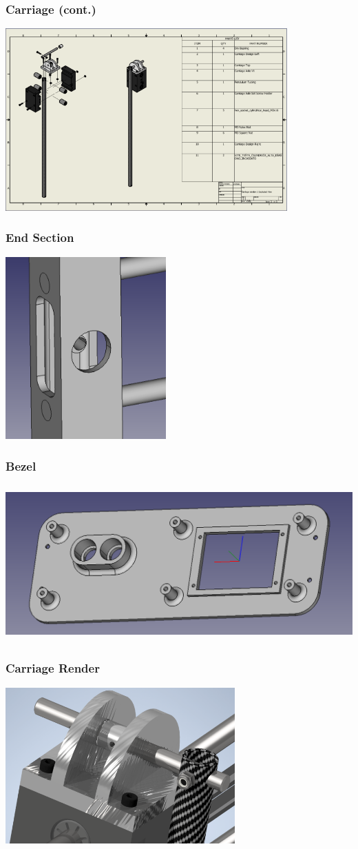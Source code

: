 \documentclass[aspectratio=169]{beamer}
\begin{document}
\begin{frame}
    \frametitle{Carriage (cont.)}

    \includegraphics[height=7cm]{closeup2}
\end{frame}

\begin{frame}
    \frametitle{End Section}

    \includegraphics[height=7cm]{closeup3}
\end{frame}

\begin{frame}
    \frametitle{Bezel}

    \includegraphics[height=6cm]{closeup4}
\end{frame}

\begin{frame}
    \frametitle{Carriage Render}

    \includegraphics[height=6cm]{closeup5}
\end{frame}
\end{document}
